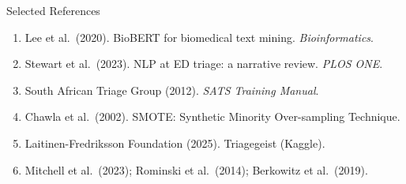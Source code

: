 \begin{frame}{Selected References}
	\small
	\begin{enumerate}
		\item Lee et al.\ (2020). BioBERT for biomedical text mining. \emph{Bioinformatics}.
		\item Stewart et al.\ (2023). NLP at ED triage: a narrative review. \emph{PLOS ONE}.
		\item South African Triage Group (2012). \emph{SATS Training Manual}.
		\item Chawla et al.\ (2002). SMOTE: Synthetic Minority Over-sampling Technique.
		\item Laitinen-Fredriksson Foundation (2025). Triagegeist (Kaggle).
		\item Mitchell et al.\ (2023); Rominski et al.\ (2014); Berkowitz et al.\ (2019).
	\end{enumerate}
\end{frame}

